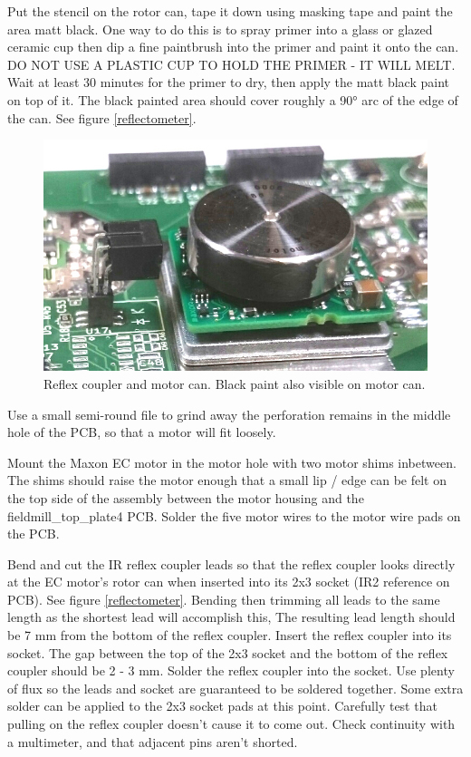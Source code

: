 \documentclass{article}
\begin{document}
Put the stencil on the rotor can, tape it down using masking tape and paint the area matt black.
One way to do this is to spray primer into a glass or glazed ceramic cup then dip a fine paintbrush into the primer and paint it onto the can.
DO NOT USE A PLASTIC CUP TO HOLD THE PRIMER - IT WILL MELT.
Wait at least 30 minutes for the primer to dry, then apply the matt black paint on top of it.
The black painted area should cover roughly a 90° arc of the edge of the can.
See figure \vref{reflectometer}.

\begin{figure}
\centering
\includegraphics[width=12cm]{reflectometer}
\caption{Reflex coupler and motor can. Black paint also visible on motor can.}
\label{reflectometer}
\end{figure}

Use a small semi-round file to grind away the perforation remains in the middle hole of the PCB,
so that a motor will fit loosely.

Mount the Maxon EC motor in the motor hole with two motor shims inbetween.
The shims should raise the motor enough that a small lip / edge can be felt on the top side of the assembly between the motor housing and the fieldmill\_top\_plate4 PCB.
Solder the five motor wires to the motor wire pads on the PCB.

Bend and cut the IR reflex coupler leads so that the reflex coupler looks directly at the EC motor's rotor can when inserted into its 2x3 socket (IR2 reference on PCB). See figure \vref{reflectometer}.
Bending then trimming all leads to the same length as the shortest lead will accomplish this,
The resulting lead length should be 7 mm from the bottom of the reflex coupler.
Insert the reflex coupler into its socket.
The gap between the top of the 2x3 socket and the bottom of the reflex coupler should be 2 - 3 mm.
Solder the reflex coupler into the socket. Use plenty of flux so the leads and socket are guaranteed to be soldered together.
Some extra solder can be applied to the 2x3 socket pads at this point.
Carefully test that pulling on the reflex coupler doesn't cause it to come out.
Check continuity with a multimeter, and that adjacent pins aren't shorted.
\end{document}
